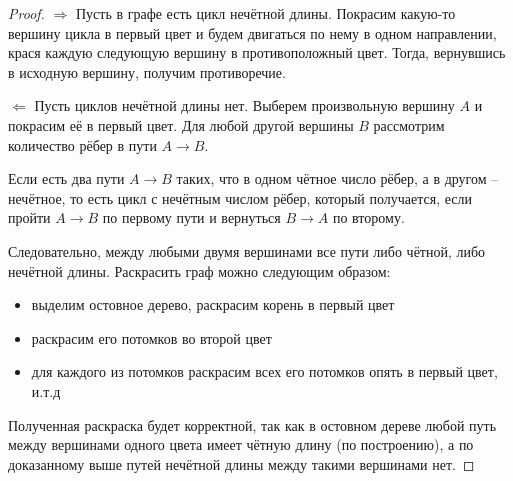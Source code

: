 \documentclass[a4paper,12pt]{article}
\begin{document}
    \begin{proof}
        \par $\Rightarrow$
        Пусть в графе есть цикл нечётной длины. Покрасим какую-то вершину цикла
        в первый цвет и будем двигаться по нему в одном направлении, крася
        каждую следующую вершину в противоположный цвет. Тогда, вернувшись в
        исходную вершину, получим противоречие.
        \par $\Leftarrow$
        Пусть циклов нечётной длины нет. Выберем произвольную вершину $A$ и
        покрасим её в первый цвет. Для любой другой вершины $B$ рассмотрим
        количество рёбер в пути $A\rightarrow B$.
        \par Если есть два пути $A\rightarrow B$ таких, что в одном чётное число
        рёбер, а в другом -- нечётное, то есть цикл с нечётным числом рёбер,
        который получается, если пройти $A\rightarrow B$ по первому пути и
        вернуться $B \rightarrow A$ по второму.
        \par Следовательно, между любыми двумя вершинами все пути либо чётной,
        либо нечётной длины. Раскрасить граф можно следующим образом:
        \begin{itemize}
            \item выделим остовное дерево, раскрасим корень в первый цвет
            \item раскрасим его потомков во второй цвет
            \item для каждого из потомков раскрасим всех его потомков опять в
                первый цвет, и.т.д
        \end{itemize}
        Полученная раскраска будет корректной, так как в остовном дереве
        любой путь между вершинами одного цвета имеет чётную длину (по
        построению), а по доказанному выше путей нечётной длины между такими
        вершинами нет.
    \end{proof}


	
\end{document}
